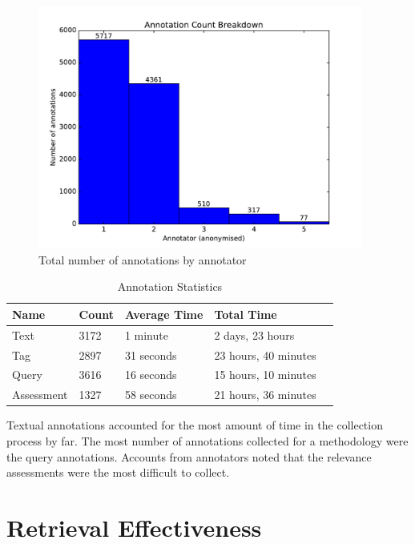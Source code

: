 \begin{figure}[!htb]
    \centering
    \includegraphics[width=0.95\textwidth]{graphs/annotator-breakdown}
    \caption{Total number of annotations by annotator}
    \label{fig:annotator-breakdown}
\end{figure}

\begin{table}[!htb]
    \centering
    \begin{tabular}{ | l | l | l | l | p{5cm} |}
    \hline
    Name & Count & Average Time & Total Time \\ \hline
    Text & 3172 & 1 minute & 2 days, 23 hours \\ \hline
    Tag & 2897 & 31 seconds & 23 hours, 40 minutes \\ \hline
    Query & 3616 & 16 seconds & 15 hours, 10 minutes \\ \hline
    Assessment & 1327 & 58 seconds & 21 hours, 36 minutes \\ \hline
    \end{tabular}
    \caption{Annotation Statistics}
    \label{table:annotation-stats}
\end{table}

Textual annotations accounted for the most amount of time in the collection process by far. The most number of annotations collected for a methodology were the query annotations. Accounts from annotators noted that the relevance assessments were the most difficult to collect. 

\FloatBarrier
\section{Retrieval Effectiveness}

